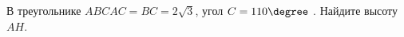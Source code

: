 \begin{ex}
	\begin{condition}
		В треугольнике \(ABC AC=BC=2\sqrt{3} \), угол \( C =110\degree\) . Найдите высоту \( AH \).
	\end{condition}
\end{ex}